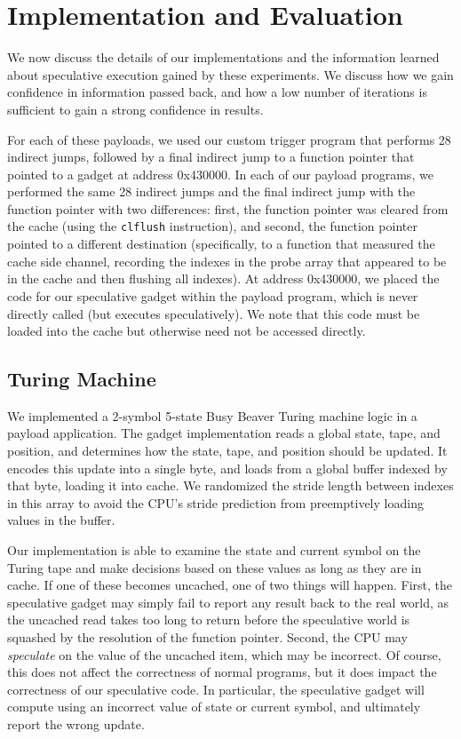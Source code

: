
\section{Implementation and Evaluation}
We now discuss the details of our implementations and the information learned
about speculative execution gained by these experiments. We discuss how we gain
confidence in information passed back, and how a low number of iterations is
sufficient to gain a strong confidence in results.

For each of these payloads, we used our custom trigger program that performs 28
indirect jumps, followed by a final indirect jump to a function pointer that
pointed to a gadget at address 0x430000. In each of our payload programs,
we performed the same 28 indirect jumps and the final indirect jump with the
function pointer with two differences: first, the function pointer was cleared
from the cache (using the \texttt{clflush} instruction), and second, the
function pointer pointed to a different destination (specifically, to a
function
that measured the cache side channel, recording the indexes in the probe array
that appeared to be in the cache and then flushing all indexes).
At address 0x430000, we placed the code for our speculative gadget within the 
payload program, which is never directly called
(but executes speculatively). We note that this code must be loaded into the
cache but otherwise need not be accessed directly.



\subsection{Turing Machine}
\label{subsec:impl-turing}

We implemented a 2-symbol 5-state Busy Beaver Turing machine logic in a  
payload application. The gadget implementation reads a global state,
tape, and position, and determines how the state, tape, and position should be
updated. It encodes this update into a single byte, and loads from a global
buffer indexed by that byte, loading it into cache.
We randomized the stride length between indexes in
this array to avoid the CPU's stride prediction from preemptively loading values
in the buffer.


Our implementation is able to examine the state and current symbol
on the Turing tape and make decisions based on these values as long as they are
in cache. If one of these becomes uncached, one of two things will happen.
First, the speculative gadget may simply fail to report any result back to the
real world, as the uncached read takes too long to return before the speculative
world is squashed by the resolution of the function pointer. Second, the CPU may
\emph{speculate} on the value of the uncached item, which may be incorrect. Of
course, this does not affect the correctness of normal programs, but it does
impact the correctness of our speculative code. In particular, the speculative
gadget will compute using an incorrect value of state or current
symbol, and ultimately report the wrong update.


